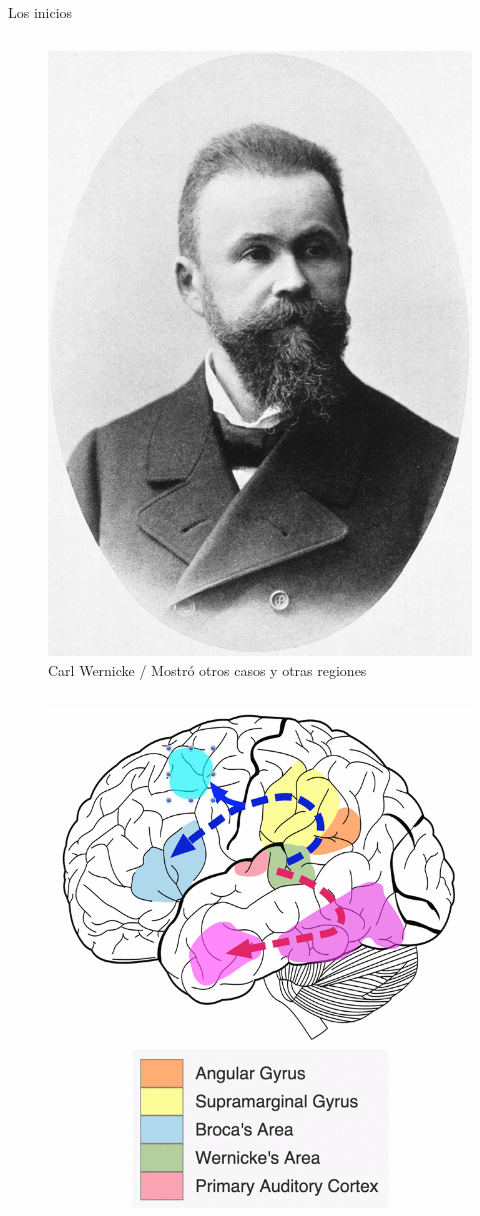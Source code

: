 \documentclass{beamer}
\begin{document}
\begin{frame}{Los inicios}
\begin{columns}
\begin{column}{0.5\textwidth}
\begin{figure}
    \includegraphics[width=0.8\linewidth]{Wernicke.jpg}
    \caption{Carl Wernicke / Mostró otros casos y otras regiones}
\end{figure}
\end{column}
\end{columns}
\end{frame}

\begin{frame}
\transfade
    \begin{figure}
        \centering
        \includegraphics[width=0.7\linewidth]{broca1.png}
        
        \label{fig:my_label}
    \end{figure}
\end{frame}
\end{document}
